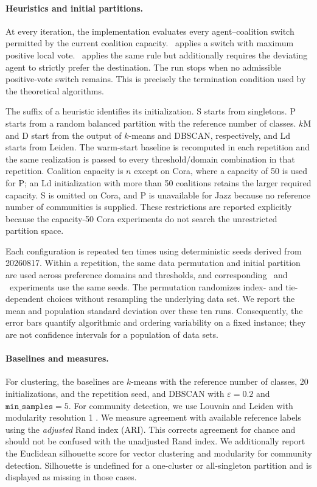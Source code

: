 \paragraph{Heuristics and initial partitions.}
At every iteration, the implementation evaluates every agent--coalition switch
permitted by the current coalition capacity.  \alglocpop\ applies a switch with
maximum positive local vote.  \alglocstab\ applies the same rule but additionally
requires the deviating agent to strictly prefer the destination.  The run stops
when no admissible positive-vote switch remains.  This is precisely the
termination condition used by the theoretical algorithms.

The suffix of a heuristic identifies its initialization.  S starts from
singletons.  P starts from a random balanced partition with the reference
number of classes.  \(k\)M and D start from the output of \(k\)-means and
DBSCAN, respectively, and Ld starts from Leiden.  The warm-start baseline is
recomputed in each repetition and the same realization is passed to every
threshold/domain combination in that repetition.  Coalition capacity is \(n\)
except on Cora, where a capacity of 50 is used for P; an Ld initialization with
more than 50 coalitions retains the larger required capacity.  S is omitted on
Cora, and P is unavailable for Jazz because no reference number of communities
is supplied.  These restrictions are reported explicitly because the
capacity-50 Cora experiments do not search the unrestricted partition space.

Each configuration is repeated ten times using deterministic seeds derived
from 20260817.  Within a repetition, the same data permutation and initial
partition are used across preference domains and thresholds, and corresponding
\alglocpop\ and \alglocstab\ experiments use the same seeds.  The permutation
randomizes index- and tie-dependent choices without resampling the underlying
data set.  We report the mean and population standard deviation over these ten
runs.  Consequently, the error bars quantify algorithmic and ordering
variability on a fixed instance; they are not confidence intervals for a
population of data sets.

\paragraph{Baselines and measures.}
For clustering, the baselines are \(k\)-means with the reference number of
classes, 20 initializations, and the repetition seed, and DBSCAN with
\(\varepsilon=0.2\) and \(\texttt{min\_samples}=5\).  For community detection,
we use Louvain and Leiden with modularity resolution 1
\cite{Albert_Louvain_and_Leiden_2023}.  We measure agreement with available
reference labels using the \emph{adjusted} Rand index (ARI).
This corrects agreement for chance and should not be confused with the
unadjusted Rand index.  We additionally report the Euclidean silhouette score
for vector clustering and modularity for community detection.  Silhouette is
undefined for a one-cluster or all-singleton partition and is displayed as
missing in those cases.

